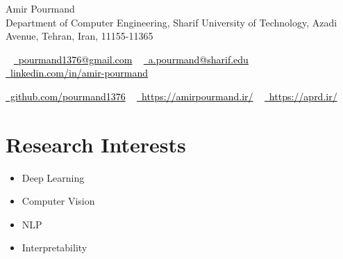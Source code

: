 \documentclass[letterpaper,11pt]{article}
\begin{document}

\begin{center}
    {\Huge 
     Amir Pourmand} \\ \vspace{5pt}
   \textcolor{sgray}{\small Department of Computer Engineering, Sharif University of Technology, Azadi Avenue, Tehran, Iran, 11155-11365} \\ \vspace{2pt}
   
  
   
    ~ 
 \href{mailto:pourmand1376@gmail.com}{ 
 	\textcolor{black}{
 	\raisebox{-0.2\height}\faEnvelope\  pourmand1376@gmail.com}}
~ 
 \href{mailto:a.pourmand@sharif.edu}
 {
 	\textcolor{black}{
 	\raisebox{-0.2\height}\faEnvelope\  a.pourmand@sharif.edu}}
\vspace{3pt}
 ~ 
    \href{https://linkedin.com/in/amir-pourmand/}
    { \textcolor{black}{
\raisebox{-0.2\height}
    \faLinkedin\ linkedin.com/in/amir-pourmand}}
    ~
    
    
    \href{https://github.com/pourmand1376}{\textcolor{black}{
    \raisebox{-0.2\height}
    \faGithub\ github.com/pourmand1376}}
    \vspace{-8pt}
    ~ 
    \href{https://amirpourmand.ir/}{
    	\textcolor{black}{
    	\raisebox{-0.2\height}\faGlobe\ https://amirpourmand.ir/}}
    ~ \href{https://aprd.ir/}{
    	\textcolor{black}{
    		\raisebox{-0.2\height}\faGlobe\ https://aprd.ir/}}
    
    \vspace{-8pt}
\end{center}

\vspace{1pt}


\section{Research Interests}
\begin{multicols}{4}
            \begin{itemize}[
            	]
	           \item Deep Learning
	           \item Computer Vision 
	           \item NLP
	           \item Interpretability
            \end{itemize}
        \end{multicols}
        \vspace*{1.0\multicolsep}
\end{document}
